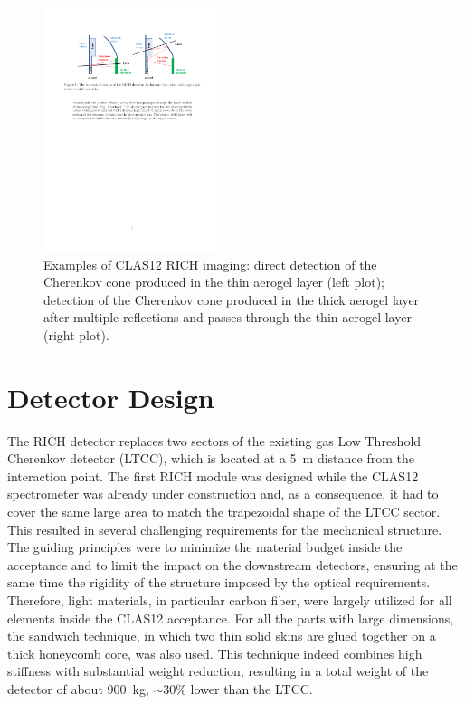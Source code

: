 \documentclass[5p,times,twocolumn]{elsarticle}
\begin{document}
\begin{figure}
\begin{center}
\includegraphics[width=0.45\textwidth]{Layout.pdf}
\caption{Examples of CLAS12 RICH imaging: direct detection of the Cherenkov cone produced in the thin aerogel layer
  (left plot); detection of the Cherenkov cone produced in the thick aerogel layer after multiple reflections and passes
  through the thin aerogel layer (right plot).}
\label{Fig:RICHsketch}
\end{center}
\end{figure}

\section{Detector Design}

The RICH detector replaces two sectors of the existing gas Low Threshold Cherenkov detector (LTCC), which is located
at a 5~m distance from the interaction point. The first RICH module was designed while the CLAS12 spectrometer was
already under construction and,  as a consequence, it had to cover the same large area to match the trapezoidal shape of
the LTCC sector. This resulted in several challenging requirements for the mechanical structure. The guiding principles
were to minimize the material budget inside the acceptance and to limit the impact on the downstream detectors,
ensuring at the same time the rigidity of the structure imposed by the optical requirements. Therefore, light materials,
in particular carbon fiber, were largely utilized for all elements inside the CLAS12 acceptance. For all the parts with
large dimensions, the sandwich technique, in which two thin solid skins are glued together on a thick honeycomb core, was
also used. This technique indeed combines high stiffness with substantial weight reduction, resulting in a total weight of
the detector of about 900~kg, $\sim$30\% lower than the LTCC.
\end{document}
